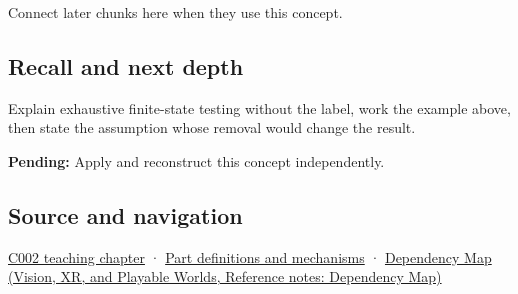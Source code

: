 \hypertarget{appendix-05db24ccc28a-used-by}{}

Connect later chunks here when they use this concept.

\subsection{Recall and next depth}\label{appendix-05db24ccc28a-recall-and-next-depth}

\hypertarget{appendix-05db24ccc28a-recall-and-next-depth}{}

Explain exhaustive finite-state testing without the label, work the example above, then state the assumption whose removal would change the result.

\textbf{Pending:} Apply and reconstruct this concept independently.

\subsection{Source and navigation}\label{appendix-05db24ccc28a-source-and-navigation}

\hypertarget{appendix-05db24ccc28a-source-and-navigation}{}

\hyperref[01-foundations-i-ch001-arithmetic-becomes-a-policy]{C002 teaching chapter} · \hyperref[appendix-fd090d982a15]{Part definitions and mechanisms} · \href{../07-Vision-XR-and-Playable-Worlds/main.pdf\#nameddest=appendix-4ad47bdd269a}{Dependency Map (Vision, XR, and Playable Worlds, Reference notes: Dependency Map)}
